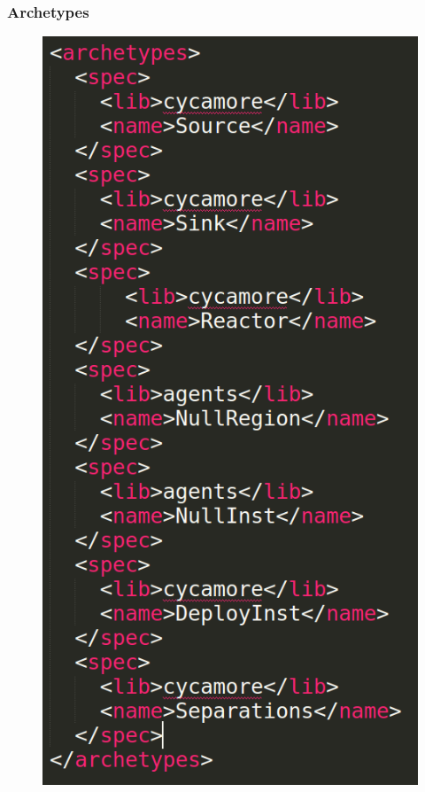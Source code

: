 \begin{frame}
    \frametitle{Archetypes}
\begin{figure}[htbp!]
        \begin{center}
                \includegraphics[height=.8\textheight]{./images/archetypes.png}
        \end{center}
    \end{figure}

\end{frame}

